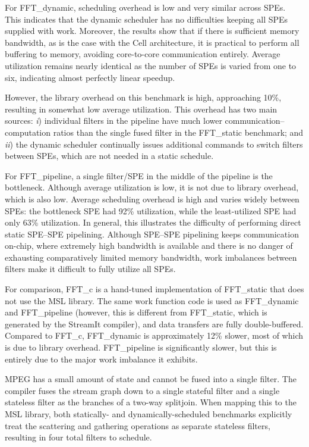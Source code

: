 For \textsf{FFT\_dynamic}, scheduling overhead is low and very similar across SPEs.
This indicates that the dynamic scheduler has no difficulties keeping all SPEs supplied with work.
Moreover, the results show that
if there is sufficient memory bandwidth, as is the case with the Cell architecture, it is practical to
perform all buffering to memory, avoiding core-to-core communication entirely.
Average utilization remains nearly identical as the number of SPEs is varied from one to six,
indicating almost perfectly linear speedup.

However, the library overhead on this benchmark is high, approaching 10\%, resulting in somewhat low average utilization. This overhead has two main sources: \emph{i}) individual filters in the pipeline have much lower communication--computation ratios than the single fused filter in the \textsf{FFT\_static} benchmark; and \emph{ii}) the dynamic scheduler continually issues additional commands to switch filters between SPEs, which are not needed in a static schedule.

For \textsf{FFT\_pipeline}, a single filter/SPE in the middle of the pipeline is the bottleneck.
Although average utilization is low, it is not due to library overhead, which is also low.
Average scheduling overhead is high and varies widely between SPEs:
the bottleneck SPE had 92\% utilization, while the least-utilized SPE had only 63\% utilization.
In general, this illustrates the difficulty of performing direct static SPE--SPE pipelining.
Although SPE--SPE pipelining keeps communication on-chip, where extremely high bandwidth
is available and there is no danger of exhausting comparatively limited memory bandwidth,
work imbalances between filters make it difficult to fully utilize all SPEs.

For comparison, \textsf{FFT\_c} is a hand-tuned implementation of \textsf{FFT\_static} that
does not use the MSL library. The same work function code is used as \textsf{FFT\_dynamic} and
\textsf{FFT\_pipeline} (however, this is different from \textsf{FFT\_static},
which is generated by the StreamIt compiler), and data transfers are fully double-buffered.
Compared to \textsf{FFT\_c}, \textsf{FFT\_dynamic} is approximately 12\% slower, most of which
is due to library overhead. \textsf{FFT\_pipeline} is significantly slower, but this
is entirely due to the major work imbalance it exhibits.

MPEG has a small amount of state and cannot be fused into a single filter.
The compiler fuses the stream graph down to a single stateful filter and
a single stateless filter as the branches of a two-way splitjoin.
When mapping this to the MSL library, both statically- and dynamically-scheduled benchmarks
explicitly treat the scattering and gathering operations as separate stateless filters,
resulting in four total filters to schedule.

